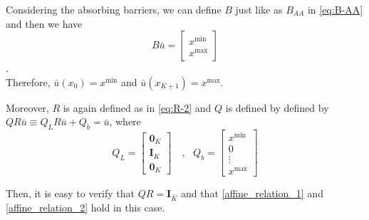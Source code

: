 \documentclass[11pt]{article}
\begin{document}
Considering the absorbing barriers, we can define $B$ just like as $B_{AA}$ in \eqref{eq:B-AA} and then we have
\begin{equation}
B\bar{u} = \begin{bmatrix}
x^{\min}\\
x^{\max}
\end{bmatrix}
\end{equation}.\\
Therefore, $\bar{u}(x_0) = x^{\min}$ and $\bar{u}(x_{K+1}) = x^{\max}$.

Moreover, $R$ is again defined as in \eqref{eq:R-2} and $Q$ is defined by defined by $Q R\bar{u}\equiv Q_L R\bar{u}+Q_b = \bar{u}$, where
\begin{equation}
Q_L = \begin{bmatrix}
\mathbf{0}_K \\
\mathbf{I}_K  \\
\mathbf{0}_K
\end{bmatrix}%
\quad, \text{ } Q_b = \begin{bmatrix}
x^{\min}\\
0\\
\vdots\\
x^{\max}
\end{bmatrix}%
\end{equation}

Then, it is easy to verify that $Q  R = \mathbf{I}_{\bar{K}}$ and that \eqref{affine_relation_1} and \eqref{affine_relation_2} hold in this case.
\end{document}
